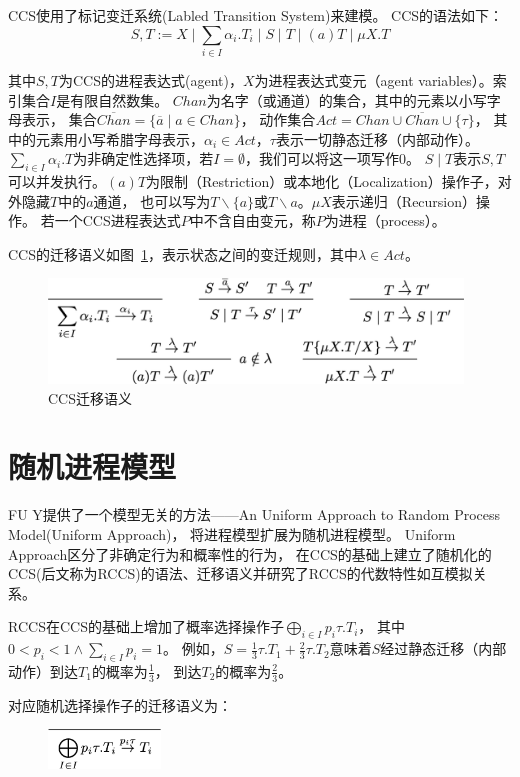    CCS使用了标记变迁系统(Labled Transition System)来建模。
   CCS的语法如下：
   $$S,T:=X\mid \sum_{i\in I}\alpha_i.T_i\mid S\mid T \mid (a)T \mid \mu X.T$$

   其中$S,T$为CCS的进程表达式(agent)，$X$为进程表达式变元（agent variables）。索引集合$I$是有限自然数集。
   $Chan$为名字（或通道）的集合，其中的元素以小写字母表示，
   集合$\overline{Chan}=\{\overline{a}\mid a\in Chan\}$，
   动作集合$Act=Chan\cup \overline{Chan}\cup \{\tau\} $，
   其中的元素用小写希腊字母表示，$\alpha_i\in Act$，$\tau$表示一切静态迁移（内部动作）。
   $\sum_{i\in I}\alpha_i.T$为非确定性选择项，若$I=\emptyset$，我们可以将这一项写作$0$。
   $S\mid T$表示$S,T$可以并发执行。$(a)T$为限制（Restriction）或本地化（Localization）操作子，对外隐藏$T$中的$a$通道，
   也可以写为$T\backslash \{a\}$或$T\backslash a$。$\mu X$表示递归（Recursion）操作。
   若一个CCS进程表达式$P$中不含自由变元，称$P$为进程（process）。

   CCS的迁移语义如图~\ref{fig_ccs}，表示状态之间的变迁规则，其中$\lambda \in Act$。

   \begin{figure}[!htbp]
    \small
    \centering
    \includegraphics[width=11cm]{../figures/ccs.png}
    \caption[]{CCS迁移语义}
     \label{fig_ccs}
 \end{figure}

   \section{随机进程模型}

   FU Y提供了一个模型无关的方法——An Uniform Approach to Random Process Model(Uniform Approach)\cite{Fu_UniformApproach}，
   将进程模型扩展为随机进程模型。
   Uniform Approach区分了非确定行为和概率性的行为，
   在CCS的基础上建立了随机化的CCS(后文称为RCCS)的语法、迁移语义并研究了RCCS的代数特性如互模拟关系。

   RCCS在CCS的基础上增加了概率选择操作子$\bigoplus_{i\in I}p_i\tau.T_i$，
   其中$0<p_i<1 \wedge \sum_{i\in I}p_i = 1$。
   例如，$S=\frac{1}{3}\tau.T_1+\frac{2}{3}\tau.T_2$意味着$S$经过静态迁移（内部动作）到达$T_1$的概率为$\frac{1}{3}$，
   到达$T_2$的概率为$\frac{2}{3}$。

   对应随机选择操作子的迁移语义为：
   \begin{figure}[!htbp]
    \small
    \centering
    \includegraphics[width=3cm]{../figures/rccs.png}
     \label{fig_rccs}
 \end{figure}

